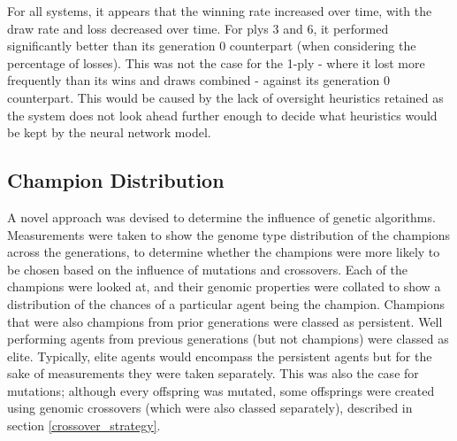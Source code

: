 \documentclass[12pt,a4paper]{article}
\begin{document}
    For all systems, it appears that the winning rate increased over time, with the draw rate and loss decreased over time. For plys 3 and 6, it performed significantly better than its generation 0 counterpart (when considering the percentage of losses). This was not the case for the 1-ply - where it lost more frequently than its wins and draws combined - against its generation 0 counterpart. This would be caused by the lack of oversight heuristics retained as the system does not look ahead further enough to decide what heuristics would be kept by the neural network model.

    \subsection{Champion Distribution}
        A novel approach was devised to determine the influence of genetic algorithms. Measurements were taken to show the genome type distribution of the champions across the generations, to determine whether the champions were more likely to be chosen based on the influence of mutations and crossovers. Each of the champions were looked at, and their genomic properties were collated to show a distribution of the chances of a particular agent being the champion. Champions that were also champions from prior generations were classed as persistent. Well performing agents from previous generations (but not champions) were classed as elite. Typically, elite agents would encompass the persistent agents but for the sake of measurements they were taken separately. This was also the case for mutations; although every offspring was mutated, some offsprings were created using genomic crossovers (which were also classed separately), described in section \ref{crossover_strategy}.  
\end{document}
